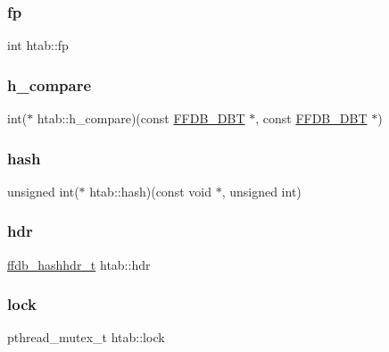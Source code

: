 \mbox{\label{structhtab_a3d34e277d5fe6638f28fd17f0627ce10}} 
\subsubsection{\texorpdfstring{fp}{fp}}
{\footnotesize\ttfamily int htab\+::fp}

\mbox{\label{structhtab_a33e1d003e5f96a3b91f9239ef970a415}} 
\subsubsection{\texorpdfstring{h\_compare}{h\_compare}}
{\footnotesize\ttfamily int($\ast$ htab\+::h\+\_\+compare)(const \mbox{\hyperlink{adat-devel_2other__libs_2filedb_2filehash_2ffdb__db_8h_aa2e0984399491df0fdd20898ca8758f9}{F\+F\+D\+B\+\_\+\+D\+BT}} $\ast$, const \mbox{\hyperlink{adat-devel_2other__libs_2filedb_2filehash_2ffdb__db_8h_aa2e0984399491df0fdd20898ca8758f9}{F\+F\+D\+B\+\_\+\+D\+BT}} $\ast$)}

\mbox{\label{structhtab_a705be8be2988b8599498615d0f9aa3ec}} 
\subsubsection{\texorpdfstring{hash}{hash}}
{\footnotesize\ttfamily unsigned int($\ast$ htab\+::hash)(const void $\ast$, unsigned int)}

\mbox{\label{structhtab_ace908dbb78be497aeb76124ebf0e26b5}} 
\subsubsection{\texorpdfstring{hdr}{hdr}}
{\footnotesize\ttfamily \mbox{\hyperlink{adat-devel_2other__libs_2filedb_2filehash_2ffdb__hash_8h_aab0f28f6f6872895710d2edc192c8d3a}{ffdb\+\_\+hashhdr\+\_\+t}} htab\+::hdr}

\mbox{\label{structhtab_a74c24a124724588e43ed76d6dea81b74}} 
\subsubsection{\texorpdfstring{lock}{lock}}
{\footnotesize\ttfamily pthread\+\_\+mutex\+\_\+t htab\+::lock}

